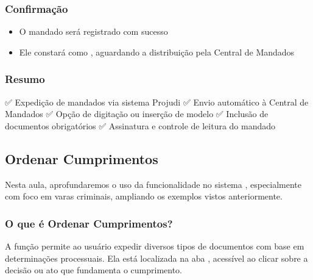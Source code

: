 \documentclass[letterpaper,10pt,brazil]{sphinxmanual}
\begin{document}
\subsubsection{Confirmação}
\label{\detokenize{projud_32_expedicaomandado:confirmacao}}\begin{itemize}
\item {} 
\sphinxAtStartPar
O mandado será registrado com sucesso

\item {} 
\sphinxAtStartPar
Ele constará como , aguardando a distribuição pela Central de Mandados

\end{itemize}


\subsubsection{Resumo}
\label{\detokenize{projud_32_expedicaomandado:resumo}}
\sphinxAtStartPar
✅ Expedição de mandados via sistema Projudi
✅ Envio automático à Central de Mandados
✅ Opção de digitação ou inserção de modelo
✅ Inclusão de documentos obrigatórios
✅ Assinatura e controle de leitura do mandado

\sphinxstepscope


\subsection{Ordenar Cumprimentos}
\label{\detokenize{projud_33_ordenarcumprimento:ordenar-cumprimentos}}\label{\detokenize{projud_33_ordenarcumprimento::doc}}
\sphinxAtStartPar
Nesta aula, aprofundaremos o uso da funcionalidade  no sistema , especialmente com foco em varas criminais, ampliando os exemplos vistos anteriormente.


\subsubsection{O que é Ordenar Cumprimentos?}
\label{\detokenize{projud_33_ordenarcumprimento:o-que-e-ordenar-cumprimentos}}
\sphinxAtStartPar
A função  permite ao usuário expedir diversos tipos de documentos com base em determinações processuais. Ela está localizada na aba , acessível ao clicar sobre a decisão ou ato que fundamenta o cumprimento.
\end{document}
